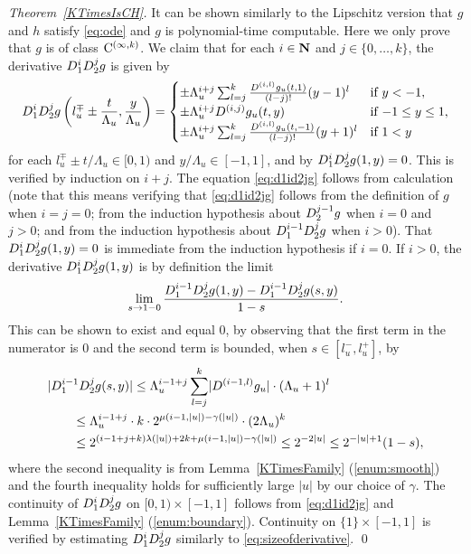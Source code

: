 \begin{proof}[Theorem~\ref{KTimesIsCH}]
It can be shown similarly to the Lipschitz version 
\cite[Theorem 3.2]{kawamura2010lipschitz}
that $g$ and $h$ satisfy \eqref{eq:ode} and $g$ is polynomial-time computable.
Here we only prove that $g$ is of class $\mathrm C^{(\infty, k)}$.
We claim that 
for each $i \in \mathbf N$ and $j \in \{0, \dots, k\}$, 
the derivative $D _1 ^i D _2 ^j g$ is given by 
\begin{equation}
   D_1^i D_2^j g \left(l^\mp_u \pm \frac{t}{\Lambda_u}, \frac{y}{\Lambda_u}\right)
   = \begin{cases}
      \pm \Lambda_u^{i+j} \sum^{k}_{l=j} \frac{D^{(i,l)} g_u(t,1)}{(l-j)!}
      (y - 1)^l &  \text{if } y < -1,
      \\
      \pm \Lambda_u^{i+j} D^{(i, j)} g_u(t, y) & \text{if } {-1} \le y \le 1,
      \\
      \pm \Lambda_u^{i+j} \sum^{k}_{l=j} 
      \frac{D^{(i,l)} g_u(t, -1)}{(l-j)!} (y + 1)^l &  \text{if } 1<y
    \end{cases}  \label{eq:d1id2jg}
\end{equation}
for each $l_u^\mp \pm t/\Lambda_u \in [0,1)$ and $y/\Lambda_u \in [-1, 1]$, 
and by $D _1 ^i D _2 ^j g (1, y) = 0$. 
This is verified by induction on $i + j$. 
The equation \eqref{eq:d1id2jg} follows from calculation 
(note that this means verifying 
that \eqref{eq:d1id2jg} follows from the definition of $g$ when $i = j = 0$; 
from the induction hypothesis about $D _2 ^{j - 1} g$ when $i = 0$ and $j > 0$; 
and from the induction hypothesis about $D _1 ^{i - 1} D _2 ^j g$ when $i > 0$).
That $D _1 ^i D _2 ^j g (1, y) = 0$ is 
immediate from the induction hypothesis if $i = 0$. 
If $i > 0$, the derivative
$D_1^i D_2^j g (1, y)$ is by definition the limit 
\begin{equation}
\lim_{s \to 1 - 0} \frac{D_1^{i-1} D_2^j g(1, y) - D_1^{i-1} D_2^j g (s, y)}{1 - s}.
\label{eq:limitofderivative}
\end{equation}
This can be shown to exist and equal $0$, 
by observing that the first term in the numerator is $0$
and the second term is bounded, when $s \in [l ^- _u, l ^+ _u]$, by 
 \begin{align}
&
  \lvert
   D_1^{i-1} D_2^j g (s, y)
  \rvert
  \le 
  \Lambda_u^{i-1+j} \sum^{k}_{l=j} \lvert D^{(i-1,l)} g_u \rvert \cdot (\Lambda_u + 1)^l 
  \notag
\\
& \qquad
 \le
  \Lambda_u^{i-1+j}  \cdot k \cdot 2^{\mu(i-1, |u|) - \gamma(|u|)} \cdot (2\Lambda_u)^k
  \notag
\\
& \qquad
  \le 2^{(i-1+j+k)\lambda(|u|) + 2k + \mu(i-1, |u|)  - \gamma(|u|)}
  \le 2^{-2 \lvert u \rvert}
  \le 2^{-\lvert u \rvert + 1} (1 - s), 
  \label{eq:sizeofderivative}
 \end{align}
where the second inequality is from 
Lemma~\ref{KTimesFamily} (\ref{enum:smooth})
and the fourth inequality holds for sufficiently large $\lvert u \rvert$
by our choice of $\gamma$. 
The continuity of $D _1 ^i D _2 ^j g$ on $[0,1) \times [-1, 1]$ follows
from \eqref{eq:d1id2jg} and Lemma~\ref{KTimesFamily} (\ref{enum:boundary}).
Continuity on $\{1\} \times [-1, 1]$ is verified by 
estimating $D_1^{i} D_2^{j} g$ similarly to \eqref{eq:sizeofderivative}. 
\qed
\end{proof} 

